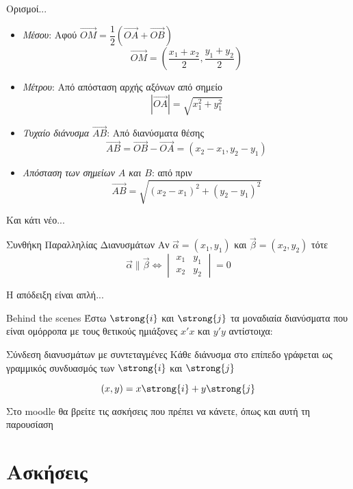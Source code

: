 \documentclass{../../presentation}
\begin{document}
\begin{frame}{Ορισμοί...}
  \begin{itemize}
    \item<1-> \emph{Μέσου}: Αφού $\overrightarrow{ΟΜ}=\dfrac{1}{2}\left( \overrightarrow{ΟΑ}+\overrightarrow{ΟΒ}\right)$
          $$\overrightarrow{ΟΜ}=\left(\dfrac{x_1+x_2}{2},\dfrac{y_1+y_2}{2}\right)$$
    \item<2-> \emph{Μέτρου}: Από απόσταση αρχής αξόνων από σημείο
          $$|\overrightarrow{ΟΑ}|=\sqrt{x_1^2+y_1^2}$$
    \item<3-> \emph{Τυχαίο διάνυσμα $\overrightarrow{ΑΒ}$}: Από διανύσματα θέσης
          $$\overrightarrow{ΑΒ}=\overrightarrow{ΟΒ}-\overrightarrow{ΟΑ}=(x_2-x_1,y_2-y_1)$$
    \item<4-> \emph{Aπόσταση των σημείων $Α$ και $Β$}: από πριν
          $$\overrightarrow{ΑΒ}=\sqrt{(x_2-x_1)^2+(y_2-y_1)^2}$$
  \end{itemize}
\end{frame}

\begin{frame}{Και κάτι νέο...}
  \begin{block}{Συνθήκη Παραλληλίας Διανυσμάτων}
    Αν $\vec{α}=(x_1,y_1)$ και $\vec{β}=(x_2,y_2)$ τότε
    $$\vec{α} 	\parallel \vec{β} \iff \begin{vmatrix}
        x_1 & y_1 \\
        x_2 & y_2
      \end{vmatrix}=0$$
  \end{block} \pause
  Η απόδειξη είναι απλή...
\end{frame}

\begin{frame}{Behind the scenes}
  Έστω $\strong{i}$ και $\strong{j}$ τα μοναδιαία διανύσματα που είναι ομόρροπα με τους θετικούς ημιάξονες $x'x$ και $y'y$ αντίστοιχα:
  \begin{block}{Σύνδεση διανυσμάτων με συντεταγμένες}
    Κάθε διάνυσμα στο επίπεδο γράφεται ως γραμμικός συνδυασμός των $\strong{i}$ και $\strong{j}$

    $$(x,y)=x\strong{i}+y\strong{j}$$
  \end{block}
\end{frame}

\begin{frame}
  Στο moodle θα βρείτε τις ασκήσεις που πρέπει να κάνετε, όπως και αυτή τη παρουσίαση
\end{frame}

\section{Ασκήσεις}
\end{document}

